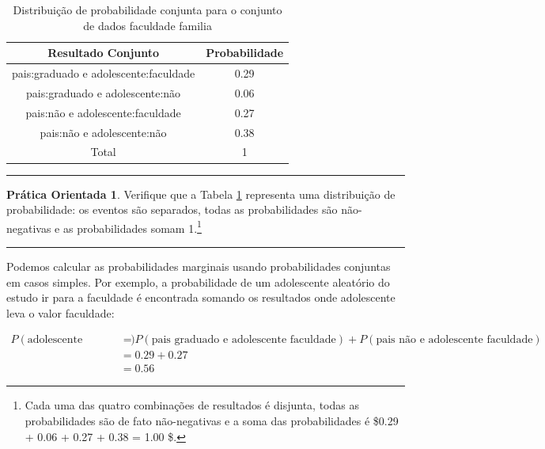 \documentclass[
]{book}
\theoremstyle{definition}
\theoremstyle{definition}
\theoremstyle{definition}
\newtheorem{exercise}{Prática Orientada}[chapter]
\theoremstyle{definition}
\theoremstyle{remark}
\begin{document}
\begin{table}

\caption{\label{tab:familyCollegeDistribution}Distribuição de probabilidade conjunta para o conjunto de dados faculdade familia}
\centering
\begin{tabular}[t]{c|c}
\hline
Resultado Conjunto & Probabilidade\\
\hline
pais:graduado e adolescente:faculdade & 0.29\\
\hline
pais:graduado e adolescente:não & 0.06\\
\hline
pais:não e adolescente:faculdade & 0.27\\
\hline
pais:não e adolescente:não & 0.38\\
\hline
Total & 1\\
\hline
\end{tabular}
\end{table}

\begin{center}\rule{0.5\linewidth}{0.5pt}\end{center}

\begin{exercise}
\protect\hypertarget{exr:unnamed-chunk-58}{}{\label{exr:unnamed-chunk-58} }Verifique que a Tabela \ref{tab:familyCollegeDistribution} representa uma distribuição de probabilidade: os eventos são separados, todas as probabilidades são não-negativas e as probabilidades somam 1.\footnote{Cada uma das quatro combinações de resultados é disjunta, todas as probabilidades são de fato não-negativas e a soma das probabilidades é \$0.29 + 0.06 + 0.27 + 0.38 = 1.00 \$.}
\end{exercise}

\begin{center}\rule{0.5\linewidth}{0.5pt}\end{center}

Podemos calcular as probabilidades marginais usando probabilidades conjuntas em casos simples. Por exemplo, a probabilidade de um adolescente aleatório do estudo ir para a faculdade é encontrada somando os resultados onde adolescente leva o valor faculdade:

\begin{align*}
P(\text{adolescente faculdade})
&=  P(\text{pais graduado e adolescente faculdade}) + P(\text{pais não e adolescente faculdade}) \\
&= 0.29 + 0.27 \\
&= 0.56
\end{align*}
\end{document}
